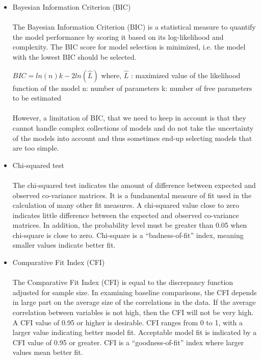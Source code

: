 \documentclass{vgtc}                          %
\begin{document}
\begin {itemize}
\item Bayesian Information Criterion (BIC)
\paragraph{}
The Bayesian Information Criterion (BIC) is a statistical measure to quantify the model performance by scoring it based on its log-likelihood and complexity.
The BIC score for model selection is minimized, i.e. the model with the lowest BIC should be selected. 


$BIC = ln(n) k - 2 ln(\hat{L})$  where,
\newline
$\hat{L}$ : maximized value of the likelihood function of the model
\newline
n: number of parameters
\newline
k: number of free parameters to be estimated
\paragraph{}
However, a limitation of BIC, that we need to keep in account is that they cannot handle complex collections of models and do not take the uncertainty of the models into account and thus sometimes end-up selecting models that are too simple.

 

\item Chi-squared test
\paragraph{}
The chi-squared test indicates the amount of difference between expected and observed co-variance matrices. It is a fundamental measure of fit used in the calculation of many other fit measures. A chi-squared value close to zero indicates little difference between the expected and observed co-variance matrices. In addition, the probability level must be greater than 0.05 when chi-square is close to zero. Chi-square is a “badness-of-fit” index, meaning smaller values indicate better fit.

\item Comparative Fit Index (CFI)
\paragraph{}
The Comparative Fit Index (CFI) is equal to the discrepancy function adjusted for sample size.
In examining baseline comparisons, the CFI depends in large part on the average size of the correlations in the data. If the average correlation between variables is not high, then the CFI will not be very high. A CFI value of 0.95 or higher is desirable.
CFI ranges from 0 to 1, with a larger value indicating better model fit. Acceptable model fit is indicated by a CFI value of 0.95 or greater. CFI is a “goodness-of-fit” index where larger values mean better fit.
 

\end{itemize}
\end{document}
